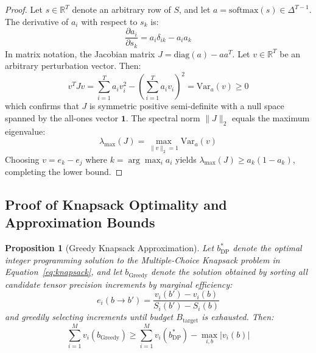 \documentclass[10pt,twocolumn,letterpaper]{article}
\newtheorem{proposition}[theorem]{Proposition}
\newcommand{\R}{\mathbb{R}}
\begin{document}
\begin{proof}
Let $s \in \R^T$ denote an arbitrary row of $S$, and let $a = \text{softmax}(s) \in \Delta^{T-1}$. The derivative of $a_i$ with respect to $s_k$ is:
\begin{equation}
    \frac{\partial a_i}{\partial s_k} = a_i \delta_{ik} - a_i a_k
\end{equation}
In matrix notation, the Jacobian matrix $J = \text{diag}(a) - a a^T$. Let $v \in \R^T$ be an arbitrary perturbation vector. Then:
\begin{equation}
    v^T J v = \sum_{i=1}^T a_i v_i^2 - \left( \sum_{i=1}^T a_i v_i \right)^2 = \text{Var}_a(v) \ge 0
\end{equation}
which confirms that $J$ is symmetric positive semi-definite with a null space spanned by the all-ones vector $\mathbf{1}$. The spectral norm $\|J\|_2$ equals the maximum eigenvalue:
\begin{equation}
    \lambda_{\max}(J) = \max_{\|v\|_2 = 1} \text{Var}_a(v)
\end{equation}
Choosing $v = e_k - e_j$ where $k = \arg\max_i a_i$ yields $\lambda_{\max}(J) \ge a_k(1 - a_k)$, completing the lower bound.
\end{proof}

\subsection{Proof of Knapsack Optimality and Approximation Bounds}
\begin{proposition}[Greedy Knapsack Approximation]
Let $b_{\text{DP}}^*$ denote the optimal integer programming solution to the Multiple-Choice Knapsack problem in Equation~\eqref{eq:knapsack}, and let $b_{\text{Greedy}}$ denote the solution obtained by sorting all candidate tensor precision increments by marginal efficiency:
\begin{equation}
    e_i(b \to b') = \frac{v_i(b') - v_i(b)}{S_i(b') - S_i(b)}
\end{equation}
and greedily selecting increments until budget $B_{\text{target}}$ is exhausted. Then:
\begin{equation}
    \sum_{i=1}^M v_i(b_{\text{Greedy}}) \ge \sum_{i=1}^M v_i(b_{\text{DP}}^*) - \max_{i, b} |v_i(b)|
\end{equation}
\end{proposition}
\end{document}
